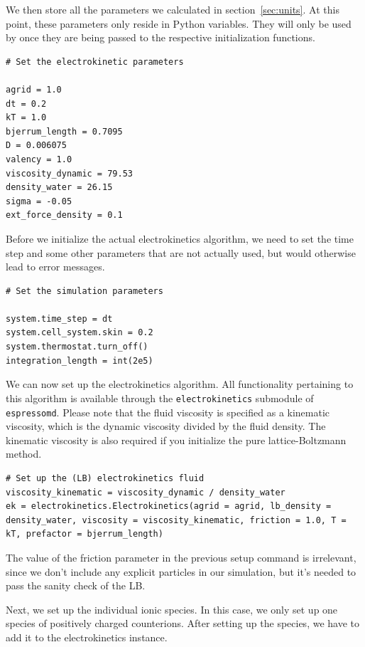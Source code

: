 We then store all the parameters we calculated in section~\ref{sec:units}. At this point, these parameters only reside in Python variables. They will only be used by \ES{} once they are being passed to the respective initialization functions.

\begin{lstlisting}[firstnumber=19]
# Set the electrokinetic parameters

agrid = 1.0
dt = 0.2
kT = 1.0
bjerrum_length = 0.7095
D = 0.006075
valency = 1.0
viscosity_dynamic = 79.53
density_water = 26.15
sigma = -0.05
ext_force_density = 0.1
\end{lstlisting}

Before we initialize the actual electrokinetics algorithm, we need to set the time step and some other parameters that are not actually used, but would otherwise lead to error messages.

\begin{lstlisting}[firstnumber=32]
# Set the simulation parameters

system.time_step = dt
system.cell_system.skin = 0.2
system.thermostat.turn_off()
integration_length = int(2e5)
\end{lstlisting}

We can now set up the electrokinetics algorithm. All functionality pertaining to this algorithm is available through the \texttt{electrokinetics} submodule of \texttt{espressomd}. Please note that the fluid viscosity is specified as a kinematic viscosity, which is the dynamic viscosity divided by the fluid density. The kinematic viscosity is also required if you initialize the pure lattice-Boltzmann method.

\begin{lstlisting}[firstnumber=39]
# Set up the (LB) electrokinetics fluid
viscosity_kinematic = viscosity_dynamic / density_water
ek = electrokinetics.Electrokinetics(agrid = agrid, lb_density = density_water, viscosity = viscosity_kinematic, friction = 1.0, T = kT, prefactor = bjerrum_length)
\end{lstlisting}

The value of the friction parameter in the previous setup command is irrelevant, since we don't include any explicit particles in our simulation, but it's needed to pass the sanity check of the LB.

Next, we set up the individual ionic species. In this case, we only set up one species of positively charged counterions. After setting up the species, we have to add it to the electrokinetics instance. 

